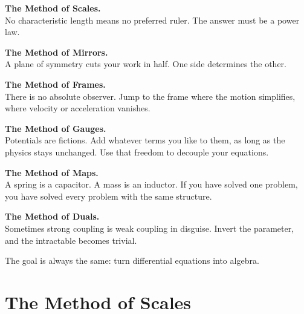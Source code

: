 \documentclass{antiquebook}
\begin{document}
\textbf{The Method of Scales.}\\ No characteristic length means no preferred ruler. The answer must be a power law.

\textbf{The Method of Mirrors.}\\ A plane of symmetry cuts your work in half. One side determines the other.

\textbf{The Method of Frames.}\\ There is no absolute observer. Jump to the frame where the motion simplifies, where velocity or acceleration vanishes.

\textbf{The Method of Gauges.}\\ Potentials are fictions. Add whatever terms you like to them, as long as the physics stays unchanged. Use that freedom to decouple your equations.

\textbf{The Method of Maps.}\\ A spring is a capacitor. A mass is an inductor. If you have solved one problem, you have solved every problem with the same structure.

\textbf{The Method of Duals.}\\ Sometimes strong coupling is weak coupling in disguise. Invert the parameter, and the intractable becomes trivial.\par
\vspace{1em}
The goal is always the same: turn differential equations into algebra.

    \section{The Method of Scales}
    
\end{document}
